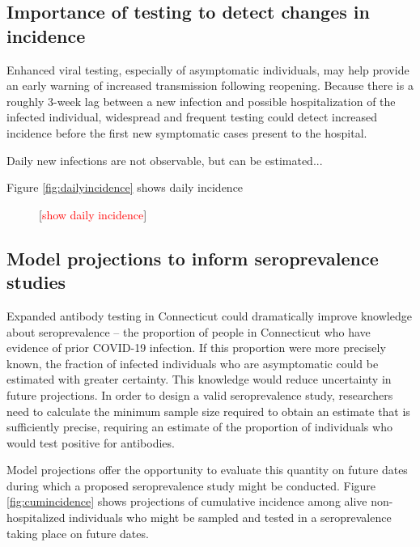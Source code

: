 \documentclass[11pt]{article}
\newcommand{\comment}[1]{[\textcolor{red}{#1}]}
\begin{document}
\subsection*{Importance of testing to detect changes in incidence}

Enhanced viral testing, especially of asymptomatic individuals, may help provide an early warning of increased transmission following reopening.  Because there is a roughly 3-week lag between a new infection and possible hospitalization of the infected individual, widespread and frequent testing could detect increased incidence before the first new symptomatic cases present to the hospital.  

Daily new infections are not observable, but can be estimated...

Figure \ref{fig:dailyincidence} shows daily incidence 




\begin{figure}
\centering
\caption{\comment{show daily incidence}}
\label{fig:dailyncidence}
\end{figure}




\subsection*{Model projections to inform seroprevalence studies}

Expanded antibody testing in Connecticut could dramatically improve knowledge about seroprevalence -- the proportion of people in Connecticut who have evidence of prior COVID-19 infection. If this proportion were more precisely known, the fraction of infected individuals who are asymptomatic could be estimated with greater certainty.   This knowledge would reduce uncertainty in future projections.  In order to design a valid seroprevalence study, researchers need to calculate the minimum sample size required to obtain an estimate that is sufficiently precise, requiring an estimate of the proportion of individuals who would test positive for antibodies. 

Model projections offer the opportunity to evaluate this quantity on future dates during which a proposed seroprevalence study might be conducted.  Figure \ref{fig:cumincidence} shows projections of cumulative incidence among alive non-hospitalized individuals who might be sampled and tested in a seroprevalence taking place on future dates.  
\end{document}
